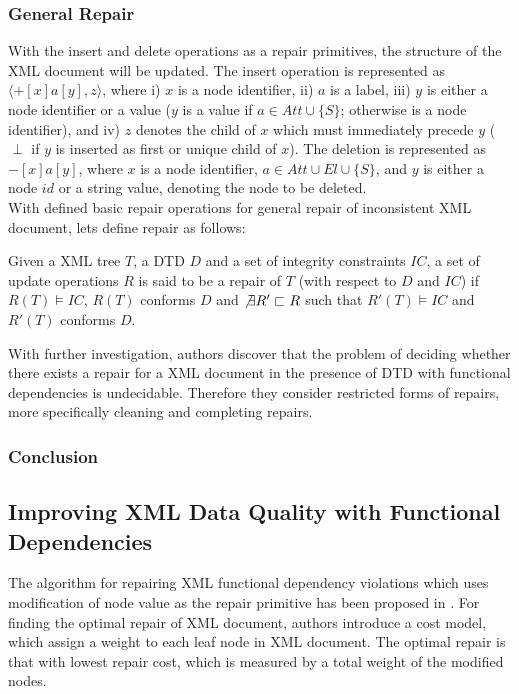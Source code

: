 \subsubsection{General Repair}

With the insert and delete operations as a repair primitives, the structure of the XML document will be updated. The insert operation is represented as $\langle  + [x]a[y], z\rangle$, where i) $x$ is a node identifier, ii) $a$ is a label, iii) $y$ is either a node identifier or a value ($y$ is a value if $a \in Att \cup \{S\}$; otherwise is a node identifier), and iv) $z$ denotes the child of $x$ which must immediately precede $y$ ($\perp$ if $y$ is inserted as first or unique child of $x$). The deletion is represented as $-[x]a[y]$, where $x$ is a node identifier, $a \in Att \cup El \cup \{S\}$, and $y$ is either a node $id$ or a string value, denoting the node to be deleted.\\
With defined basic repair operations for general repair of inconsistent XML document, lets define repair as follows:

\begin{define}[Repair]
Given a XML tree $T$, a DTD $D$ and a set of integrity constraints $IC$, a set of update operations $R$ is said to be a repair of $T$ (with respect to $D$ and $IC$) if $R(T) \models IC$, $R(T)$ conforms $D$ and $\not \exists R' \sqsubset R$ such that $R'(T) \models IC$ and $R'(T)$ conforms $D$.
\end{define}

With further investigation, authors discover that the problem of deciding whether there exists a repair for a XML document in the presence of DTD with functional dependencies is undecidable. Therefore they consider restricted forms of repairs, more specifically cleaning and completing repairs.

\subsubsection{Conclusion}



\subsection{Improving XML Data Quality with Functional Dependencies}

The algorithm for repairing XML functional dependency violations which uses modification of node value as the repair primitive has been proposed in \cite{ImprovingXML}. For finding the optimal repair of XML document, authors introduce a cost model, which assign a weight to each leaf node in XML document. The optimal repair is that with lowest repair cost, which is measured by a total weight of the modified nodes.

